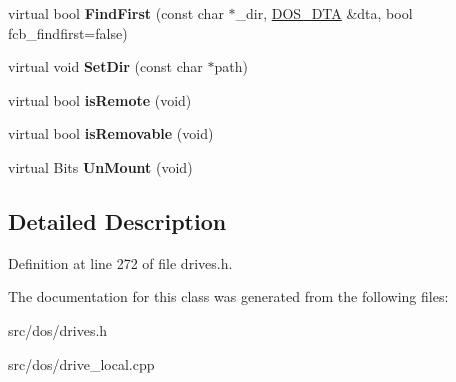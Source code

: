 \begin{DoxyCompactItemize}
\item 
\hypertarget{classcdromDrive_afd0347b272659c24f6f3cd9b7b05f89c}{virtual bool {\bfseries Find\-First} (const char $\ast$\-\_\-dir, \hyperlink{classDOS__DTA}{D\-O\-S\-\_\-\-D\-T\-A} \&dta, bool fcb\-\_\-findfirst=false)}\label{classcdromDrive_afd0347b272659c24f6f3cd9b7b05f89c}

\item 
\hypertarget{classcdromDrive_a3aeeb35dbd5100a4b973aa6341295521}{virtual void {\bfseries Set\-Dir} (const char $\ast$path)}\label{classcdromDrive_a3aeeb35dbd5100a4b973aa6341295521}

\item 
\hypertarget{classcdromDrive_a2186d681041aad9456c57cd4be5cc0bc}{virtual bool {\bfseries is\-Remote} (void)}\label{classcdromDrive_a2186d681041aad9456c57cd4be5cc0bc}

\item 
\hypertarget{classcdromDrive_ab96402d6d61617f26d545268e1127a07}{virtual bool {\bfseries is\-Removable} (void)}\label{classcdromDrive_ab96402d6d61617f26d545268e1127a07}

\item 
\hypertarget{classcdromDrive_a4e5d16dc2a6171b622ed815b464f1114}{virtual Bits {\bfseries Un\-Mount} (void)}\label{classcdromDrive_a4e5d16dc2a6171b622ed815b464f1114}

\end{DoxyCompactItemize}


\subsection{Detailed Description}


Definition at line 272 of file drives.\-h.



The documentation for this class was generated from the following files\-:\begin{DoxyCompactItemize}
\item 
src/dos/drives.\-h\item 
src/dos/drive\-\_\-local.\-cpp\end{DoxyCompactItemize}
